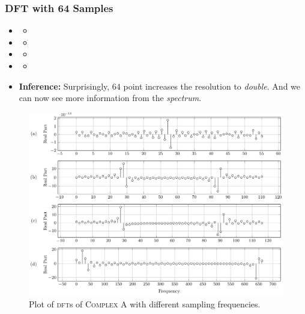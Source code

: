\documentclass[../../course]{subfiles}
\begin{document}
\subsubsection{DFT with 64 Samples}

\begin{itemize} [label=]

    \item \sampFreqMuchLess
        \begin{itemize} [label=]
            \item
        \end{itemize}

    \item \sampFreqNorm
        \begin{itemize} [label=]
            \item
        \end{itemize}

    \item \sampFreqSligGreat
        \begin{itemize} [label=]
            \item
        \end{itemize}

    \item \sampFreqMuchGreat
        \begin{itemize} [label=]
            \item
        \end{itemize}

    \item \textbf{Inference:} Surprisingly, $64$ point increases the resolution to \emph{double}. And we
        can now see more information from the \emph{spectrum}.

\end{itemize}

\vfill

\begin{figure} [H]
    \centering
     {
        \includegraphics[height = 0.8\textheight] {tikzpics/plotDftComplexA64.pdf}
    }
     {Plot of \textsc{dft}s of \textsc{Complex A} with different sampling frequencies.}
    \label{plt:dftCplxA64}
\end{figure}
\end{document}
